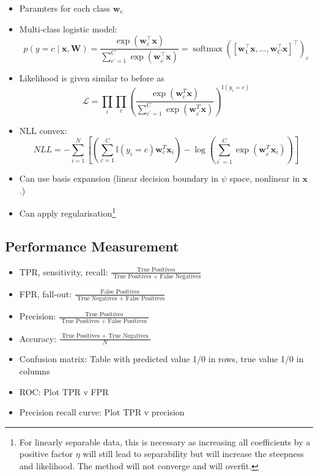 \documentclass[11pt, %
	oneside, %
	english, %
	onehalfspacing, %
	parskip, %
	]{article} %
\theoremstyle{definition}
\begin{document}
\begin{itemize}
	\item Paramters for each class $\mathbf{w}_c$
	\item Multi-class logistic model:
	\begin{equation*}
		p(y=c \mid \mathbf{x}, \mathbf{W})=\frac{\exp \left(\mathbf{w}_c^{\top} \mathbf{x}\right)}{\sum_{c^{\prime}=1}^C \exp \left(\mathbf{w}_{c^{\prime}}^{\top} \mathbf{x}\right)} =\operatorname{softmax}\left(\left[\mathbf{w}_1^{\top} \mathbf{x}, \ldots, \mathbf{w}_C^{\top} \mathbf{x}\right]^{\top}\right)_c
	\end{equation*}
	\item Likelihood is given similar to before as
	\begin{equation*}
		\mathcal{L} = \prod_i \prod_c \left(\frac{\exp \left(\mathbf{w}_c^T \mathbf{x}\right)}{\sum_{c^{\prime}=1}^C \exp \left(\mathbf{w}_{c^{\prime}}^T \mathbf{x}\right)}\right)^{\mathbb{I}(y_i = c)}
	\end{equation*}
	\item NLL convex:
	\begin{equation*}
		NLL =-\sum_{i=1}^N\left[\left(\sum_{c=1}^C \mathbb{I}(y_i = c)\mathbf{w}_c^T \mathbf{x}_i\right)-\log \left(\sum_{c^{\prime}=1}^C \exp \left(\mathbf{w}_{c^{\prime}}^T \mathbf{x}_i\right)\right)\right]
	\end{equation*}

	\item Can use basis expansion (linear decision boundary in $\psi$ space, nonlinear in $\mathbf{x}$.)
	\item Can apply regularisation\footnote{For linearly separable data, this is necessary as increasing all coefficients by a positive factor $\eta$ will still lead to separability but will increase the steepness and likelihood. The method will not converge and will overfit.}
\end{itemize}


\subsection{Performance Measurement}

\begin{itemize}
	\item TPR, sensitivity, recall: $\frac{\text { True Positives }}{\text { True Positives + False Negatives} }$
	\item FPR, fall-out: $\frac{\text { False Positives }}{\text { True Negatives + False Positives} }$
	\item Precision: $\frac{\text { True Positives }}{\text { True Positives }+ \text { False Positives }}$
	\item Accuracy:  $\frac{\text { True Positives + True Negatives }}{N}$
	\item Confusion matrix: Table with predicted value 1/0 in rows, true value 1/0 in columns
	\item ROC: Plot TPR v FPR
	\item Precision recall curve: Plot TPR v precision
\end{itemize}
\end{document}
